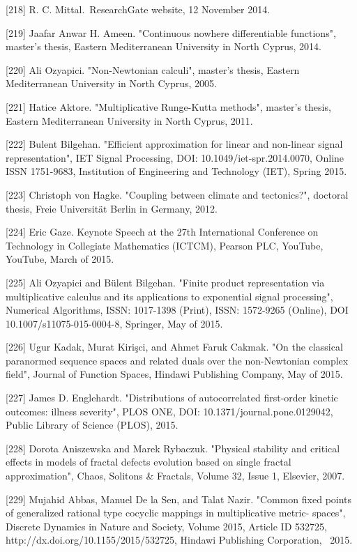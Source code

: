 \documentclass[12pt]{article}
\begin{document}
[218] R. C. Mittal. ResearchGate website, 12 November 2014.

[219] Jaafar Anwar H. Ameen. "Continuous nowhere differentiable functions", master's thesis, Eastern Mediterranean University in North Cyprus, 2014.

[220] Ali Ozyapici. "Non-Newtonian calculi", master's thesis, Eastern Mediterranean University in North Cyprus, 2005.

[221] Hatice Aktore. "Multiplicative Runge-Kutta methods", master's thesis, Eastern Mediterranean University in North Cyprus, 2011.

[222] Bulent Bilgehan. "Efficient approximation for linear and non-linear signal representation", IET Signal Processing, DOI: 10.1049/iet-spr.2014.0070, Online ISSN 1751-9683, Institution of Engineering and Technology (IET), Spring 2015.

[223] Christoph von Hagke. "Coupling between climate and tectonics?", doctoral thesis, Freie Universität Berlin in Germany, 2012.

[224] Eric Gaze. Keynote Speech at the 27th International Conference on Technology in Collegiate Mathematics (ICTCM), Pearson PLC, YouTube,  YouTube, March of 2015.

[225] Ali Ozyapici and Bülent Bilgehan. "Finite product representation via multiplicative calculus and its applications to exponential signal processing", Numerical Algorithms, ISSN: 1017-1398 (Print), ISSN: 1572-9265 (Online), DOI 10.1007/s11075-015-0004-8, Springer, May of 2015.

[226] Ugur Kadak, Murat Kirişci, and Ahmet Faruk Cakmak. "On the classical paranormed sequence spaces and related duals over the non-Newtonian complex field", Journal of Function Spaces, Hindawi Publishing Company, May of 2015.  

[227] James D. Englehardt. "Distributions of autocorrelated first-order kinetic outcomes: illness severity", PLOS ONE, DOI: 10.1371/journal.pone.0129042, Public Library of Science (PLOS), 2015. 

[228] Dorota Aniszewska and Marek Rybaczuk. "Physical stability and critical effects in models of fractal defects evolution based on single fractal approximation", Chaos, Solitons & Fractals, Volume 32, Issue 1, Elsevier, 2007.

[229] Mujahid Abbas, Manuel De la Sen, and Talat Nazir. "Common fixed points of generalized rational type cocyclic mappings in multiplicative metric- spaces", Discrete Dynamics in Nature and Society, Volume 2015, Article ID 532725, http://dx.doi.org/10.1155/2015/532725, Hindawi Publishing Corporation,  2015.
\end{document}
